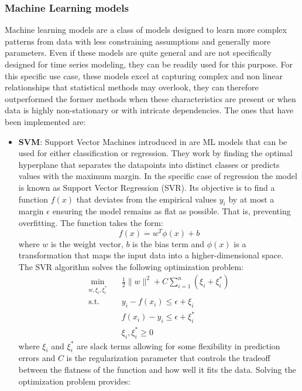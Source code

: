 \subsubsection{Machine Learning models}
Machine learning models are a class of models designed to learn more complex patterns from data with less constraining assumptions and generally more parameters. Even if these models are quite general and are not specifically designed for time series modeling, they can be readily used for this purpose. For this specific use case, these models excel at capturing complex and non linear relationships that statistical methods may overlook, they can therefore outperformed the former methods when these characteristics are present or when data is highly non-stationary or with intricate dependencies. The ones that have been implemented are:
\begin{itemize}
    \item \textbf{SVM}: Support Vector Machines introduced in \cite{cortes_vladimir_vapnik_1995} are ML models that can be used for either classification or regression. They work by finding the optimal hyperplane that separates the datapoints into distinct classes or predicts values with the maximum margin. In the specific case of regression the model is known as Support Vector Regression (SVR). Its objective is to find a function $f(x)$ that deviates from the empirical values $y_i$ by at most a margin $\epsilon$ ensuring the model remains as flat as possible. That is, preventing overfitting. The function takes the form:
    \begin{equation}
        f(x)=w^T\phi(x)+b
    \end{equation} 
    where $w$ is the weight vector, $b$ is the bias term and $\phi(x)$ is a transformation that maps the input data into a higher-dimensional space. The SVR algorithm solves the following optimization problem:
    \begin{equation}
        \begin{aligned}
            \min_{w,\xi_i,\xi_i^*} \quad & \frac{1}{2}\|w\|^2+C\sum_{i=1}^n\left(\xi_i+\xi_i^*\right)\\
            \textrm{s.t.} \quad & y_i-f(x_i) \leq \epsilon+\xi_i\\
            & f(x_i)-y_i \leq \epsilon + \xi_i^*\\
            & \xi_i,\xi_i^*\geq 0
        \end{aligned}
    \end{equation}
    where $\xi_i$ and $\xi_i^*$ are slack terms allowing for some flexibility in prediction errors and $C$ is the regularization parameter that controls the tradeoff between the flatness of the function and how well it fits the data. Solving the optimization problem provides:

\end{itemize}
